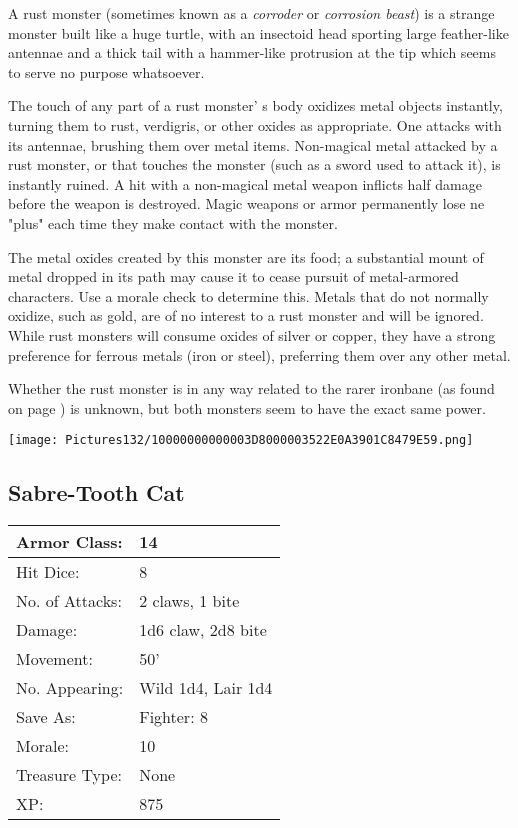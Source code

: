 \documentclass[a4paper,twoside,openany,10pt]{book}
\begin{document}
\begin{multicols}{2}
A rust monster (sometimes known as a \emph{corroder} or \emph{corrosion beast}) is a strange monster built like a huge turtle, with an insectoid head sporting large feather-like antennae and a thick tail with a hammer-like protrusion at the tip which seems to serve no purpose whatsoever.

The touch of any part of a rust monster' s body oxidizes metal objects instantly, turning them to rust, verdigris, or other oxides as appropriate. One attacks with its antennae, brushing them over metal items. Non-magical metal attacked by a rust monster, or that touches the monster (such as a sword used to attack it), is instantly ruined. A hit with a non-magical metal weapon inflicts half damage before the weapon is destroyed. Magic weapons or armor permanently lose ne "plus" each time they make contact with the monster. 

The metal oxides created by this monster are its food; a substantial mount of metal dropped in its path may cause it to cease pursuit of metal-armored characters. Use a morale check to determine this. Metals that do not normally oxidize, such as gold, are of no interest to a rust monster and will be ignored. While rust monsters will consume oxides of silver or copper, they have a strong preference for ferrous metals (iron or steel), preferring them over any other metal.

Whether the rust monster is in any way related to the rarer ironbane (as found on page \hyperlink{ironbane}{\pageref{ironbane}}) is unknown, but both monsters seem to have the exact same power.

\begin{center} \texttt{[image: Pictures132/10000000000003D8000003522E0A3901C8479E59.png]} \end{center}

\subsection*{Sabre-Tooth Cat}\label{sabre-tooth-cat}

\begin{tabularx}{0.50\textwidth}{@{}lX@{}}
Armor Class: & 14 \\\hline
Hit Dice: & 8 \\\hline
No. of Attacks: & 2 claws, 1 bite \\\hline
Damage: & 1d6 claw, 2d8 bite \\\hline
Movement: & 50' \\\hline
No. Appearing: & Wild 1d4, Lair 1d4 \\\hline
Save As: & Fighter: 8 \\\hline
Morale: & 10 \\\hline
Treasure Type: & None \\\hline
XP: & 875 \\\hline
\end{tabularx}\medskip


\end{multicols}
\end{document}
